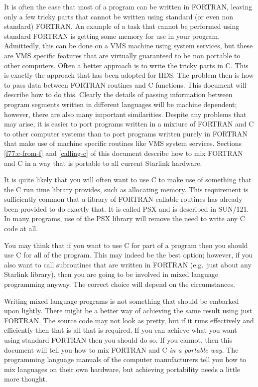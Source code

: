 It is often the case that most of a program can be written in FORTRAN, leaving
only a few tricky parts that cannot be written using standard (or even non
standard) FORTRAN. An example of a task that cannot be performed using standard
FORTRAN is getting some memory for use in your program. Admittedly, this can be
done on a VMS machine using system services, but these are VMS specific
features that are virtually guaranteed to be non portable to other computers.
Often a better approach is to write the tricky parts in C. This is exactly the
approach that has been adopted for HDS. The problem then is how to pass data
between FORTRAN routines and C functions. This document will describe  how to
do this. Clearly the details of passing information between program segments
written in different languages will be machine dependent; however, there are
also many important similarities. Despite any problems that may arise, it is
easier to port programs written in a mixture of FORTRAN and C to other computer
systems than to port programs written purely in FORTRAN that make use of
machine specific routines like VMS system services. Sections \ref{f77:c-from-f}
and \ref{calling-c} of this document describe how to mix FORTRAN and C in a way
that is portable to all current Starlink hardware.

It is quite likely that you will often want to use C to make use of something
that the C run time library provides, such as allocating memory. This
requirement is sufficiently common that a library of FORTRAN callable routines
has already been provided to do exactly that. It is called PSX and is described
in SUN/121. In many programs, use of the PSX library will remove the need to
write any C code at all.

You may think that if you want to use C for part of a program then you should
use C for all of the program. This may indeed be the best option; however, if
you also want to call subroutines that are written in FORTRAN (e.g.\ just about
any Starlink library), then you are going to be involved in mixed language
programming anyway. The correct choice will depend on the circumstances.

Writing mixed language programs is not something that should be embarked upon
lightly. There might be a better way of achieving the same result using just
FORTRAN. The source code may not look as pretty, but if it runs effectively and
efficiently then that is all that is required. If you can achieve what you want
using standard FORTRAN then you should do so. If you cannot, then this document
will tell you how to mix FORTRAN and C {\em in a portable way}. The programming
language manuals of the computer manufacturers tell you how to mix languages on
their own hardware, but achieving portability needs a little more thought.

